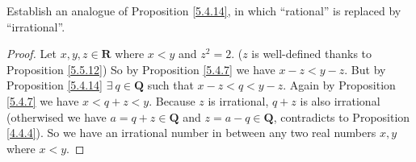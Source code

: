 \begin{exercise}\label{ex 5.5.5}
    Establish an analogue of Proposition \ref{5.4.14}, in which ``rational'' is replaced by ``irrational''.
\end{exercise}

\begin{proof}
    Let \(x, y, z \in \mathbf{R}\) where \(x < y\) and \(z^2 = 2\).
    (\(z\) is well-defined thanks to Proposition \ref{5.5.12})
    So by Proposition \ref{5.4.7} we have \(x - z < y - z\).
    But by Proposition \ref{5.4.14} \(\exists\ q \in \mathbf{Q}\) such that \(x - z < q < y - z\).
    Again by Proposition \ref{5.4.7} we have \(x < q + z < y\).
    Because \(z\) is irrational, \(q + z\) is also irrational
    (otherwised we have \(a = q + z \in \mathbf{Q}\) and \(z = a - q \in \mathbf{Q}\), contradicts to Proposition \ref{4.4.4}).
    So we have an irrational number in between any two real numbers \(x, y\) where \(x < y\).
\end{proof}